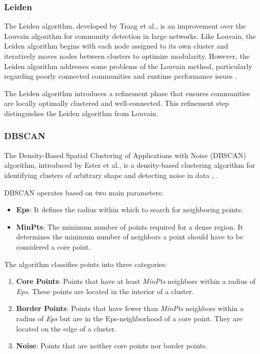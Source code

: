 \documentclass{ieeeaccess}
\begin{document}
\subsubsection{Leiden}
\label{subsubsec:leiden}

The Leiden algorithm, developed by Traag et al., is an improvement over the Louvain algorithm for community detection in large networks. Like Louvain, the Leiden algorithm begins with each node assigned to its own cluster and iteratively moves nodes between clusters to optimize modularity. However, the Leiden algorithm addresses some problems of the Louvain method, particularly regarding poorly connected communities and runtime performance issues \cite{leiden} \cite{scikit}.

The Leiden algorithm introduces a refinement phase that ensures communities are locally optimally clustered and well-connected. This refinement step distinguishes the Leiden algorithm from Louvain.


\subsubsection{DBSCAN}
\label{subsubsec:dbscan}

The Density-Based Spatial Clustering of Applications with Noise (DBSCAN) algorithm, introduced by Ester et al., is a density-based clustering algorithm for identifying clusters of arbitrary shape and detecting noise in data \cite{dbscan}, \cite{scikit}.

DBSCAN operates based on two main parameters:

\begin{itemize}
\item \textbf{Eps}: It defines the radius within which to search for neighboring points.
\item \textbf{MinPts}: The minimum number of points required for a dense region. It determines the minimum number of neighbors a point should have to be considered a core point.
\end{itemize}

The algorithm classifies points into three categories:

\begin{enumerate}
\item \textbf{Core Points}: Points that have at least \textit{MinPts} neighbors within a radius of \textit{Eps}. These points are located in the interior of a cluster.
\item \textbf{Border Points}: Points that have fewer than \textit{MinPts} neighbors within a radius of \textit{Eps} but are in the Eps-neighborhood of a core point. They are located on the edge of a cluster.
\item \textbf{Noise}: Points that are neither core points nor border points.
\end{enumerate}
\end{document}
